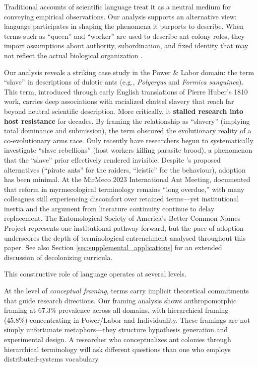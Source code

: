 \documentclass[
]{article}
\numberwithin{equation}{section}
\begin{document}
Traditional accounts of scientific language treat it as a neutral medium
for conveying empirical observations. Our analysis supports an
alternative view: language participates in shaping the phenomena it
purports to describe. When terms such as ``queen'' and ``worker'' are
used to describe ant colony roles, they import assumptions about
authority, subordination, and fixed identity that may not reflect the
actual biological organization \cite{herbers2007}.

Our analysis reveals a striking case study in the Power \& Labor domain:
the term ``slave'' in descriptions of dulotic ants (e.g.,
\emph{Polyergus} and \emph{Formica sanguinea}). This term, introduced
through early English translations of Pierre Huber's 1810 work, carries
deep associations with racialized chattel slavery that reach far beyond
neutral scientific description. More critically, it \textbf{stalled
research into host resistance} for decades. By framing the relationship
as ``slavery'' (implying total dominance and submission), the term
obscured the evolutionary reality of a co-evolutionary arms race. Only
recently have researchers begun to systematically investigate ``slave
rebellions'' (host workers killing parasite brood), a phenomenon that
the ``slave'' prior effectively rendered invisible. Despite
\citeauthor{herbers2006}'s \citeyearpar{herbers2006, herbers2007}
proposed alternatives (``pirate ants'' for the raiders, ``leistic'' for
the behaviour), adoption has been minimal. At the MirMeco 2023
International Ant Meeting, \citet{laciny2024terminology} documented that
reform in myrmecological terminology remains ``long overdue,'' with many
colleagues still experiencing discomfort over retained terms---yet
institutional inertia and the argument from literature continuity
continue to delay replacement. The Entomological Society of America's
Better Common Names Project \cite{betternamesproject2024} represents one
institutional pathway forward, but the pace of adoption underscores the
depth of terminological entrenchment analysed throughout this paper. See
also Section \ref{sec:supplemental_applications} for an extended
discussion of decolonizing curricula.

This constructive role of language operates at several levels.

At the level of \emph{conceptual framing}, terms carry implicit
theoretical commitments that guide research directions. Our framing
analysis shows anthropomorphic framing at 67.3\% prevalence across all
domains, with hierarchical framing (45.8\%) concentrating in Power/Labor
and Individuality. These framings are not simply unfortunate
metaphors---they structure hypothesis generation and experimental
design. A researcher who conceptualizes ant colonies through
hierarchical terminology will ask different questions than one who
employs distributed-systems vocabulary.
\end{document}
